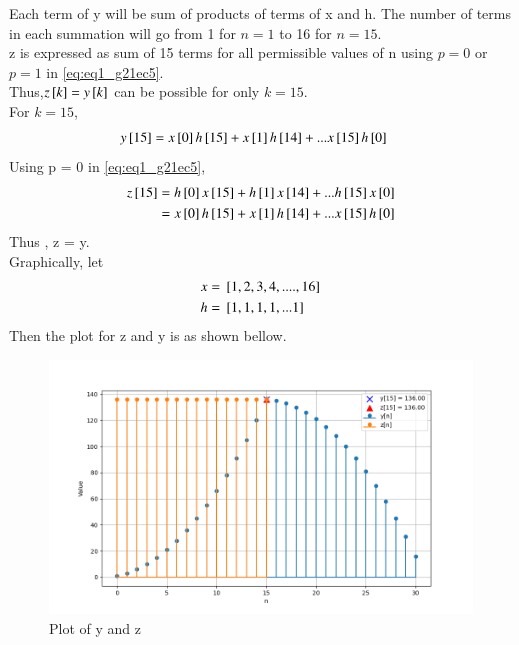\documentclass[journal,12pt,twocolumn]{IEEEtran}
\theoremstyle{remark}
\begin{document}
Each term of y will be sum of products of terms of x and h. The number of terms in each summation will go from 1 for $n=1$ to 16 for $n=15$. \\
z is expressed as sum of 15 terms for all permissible values of n using $p=0$ or $p=1$ in \eqref{eq:eq1_g21ec5}.
\\ Thus,$z{}\left[k\right] = y{}\left[k\right]$ can be possible for only $k=15$.
\\ For $k = 15$,
\begin{align}
    y{}\left[15\right] &= x{}\left[0\right]h{}\left[15\right] +  x{}\left[1\right]h{}\left[14\right] + ...  x{}\left[15\right]h{}\left[0\right] 
\end{align}
Using p = 0  in \eqref{eq:eq1_g21ec5},
\begin{align}
    z{}\left[15\right] &= h{}\left[0\right] x{}\left[15\right] + h{}\left[1\right] x{}\left[14\right] + ... h{}\left[15\right] x{}\left[0\right]\\
    &=  x{}\left[0\right]h{}\left[15\right] +  x{}\left[1\right]h{}\left[14\right] + ...  x{}\left[15\right]h{}\left[0\right] 
\end{align}
Thus , z = y.\\
Graphically, let 
\begin{align}
    x &= {}\left[1,2,3,4,....,16\right]\\
    h &= {}\left[1,1,1,1, ... 1\right]
\end{align}
Then the plot for z and y is as shown bellow.
\begin{figure}[!ht]
\centering
\begin{center}
\includegraphics[width=\columnwidth]{2021/EC/5/figs/Figure_1.png}
\end{center}
\caption{Plot of y and z}
\end{figure}
\end{document}

